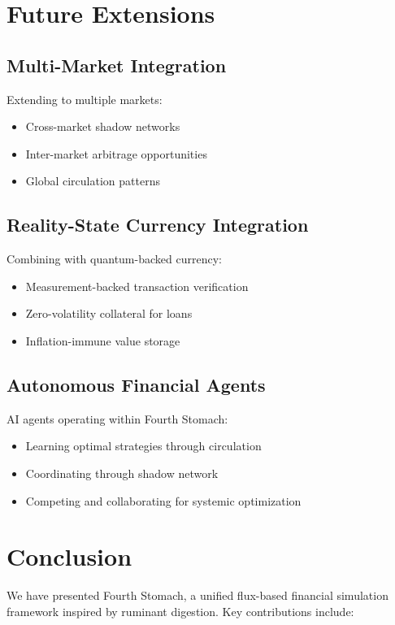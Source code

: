 \documentclass[12pt]{article}
\begin{document}
\section{Future Extensions}

\subsection{Multi-Market Integration}

Extending to multiple markets:
\begin{itemize}
    \item Cross-market shadow networks
    \item Inter-market arbitrage opportunities
    \item Global circulation patterns
\end{itemize}

\subsection{Reality-State Currency Integration}

Combining with quantum-backed currency:
\begin{itemize}
    \item Measurement-backed transaction verification
    \item Zero-volatility collateral for loans
    \item Inflation-immune value storage
\end{itemize}

\subsection{Autonomous Financial Agents}

AI agents operating within Fourth Stomach:
\begin{itemize}
    \item Learning optimal strategies through circulation
    \item Coordinating through shadow network
    \item Competing and collaborating for systemic optimization
\end{itemize}

\section{Conclusion}

We have presented Fourth Stomach, a unified flux-based financial simulation framework inspired by ruminant digestion. Key contributions include:
\end{document}
